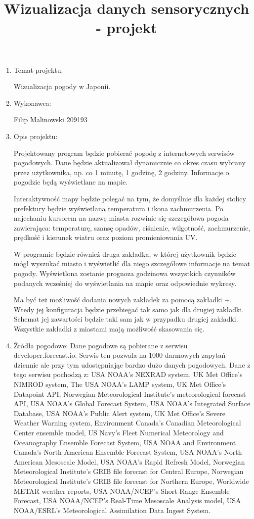 \documentclass[a4paper]{article}
\title{Wizualizacja danych sensorycznych - projekt}
\date{}
\begin{document}
\maketitle

\begin{enumerate}

\item Temat projektu:

Wizualizacja pogody w Japonii.

\item Wykonawca:

Filip Malinowski 209193

\item Opis projektu:

Projektowany program będzie pobierać pogodę z internetowych serwisów pogodowych. Dane będzie aktualizował dynamicznie co okres czasu wybrany przez użytkownika, np. co 1 minutę, 1 godzinę, 2 godziny. Informacje o pogodzie będą wyświetlane na mapie.

Interaktywność mapy będzie polegać na tym, że domyślnie dla każdej stolicy prefektury będzie wyświetlana temperatura i ikona zachmurzenia. Po najechaniu kursorem na nazwę miasta rozwinie się szczegółowa pogoda zawierająca: temperaturę, szansę opadów, ciśnienie, wilgotność, zachmurzenie, prędkość i kierunek wiatru oraz poziom promieniowania UV.

W programie będzie również druga zakładka, w której użytkownik będzie mógł wyszukać miasto i wyświetlić dla niego szczegółowe informacje na temat pogody. Wyświetlona zostanie prognoza godzinowa wszystkich czynników podanych wcześniej do wyświetlania na mapie oraz odpowiednie wykresy.

Ma być też możliwość dodania nowych zakładek za pomocą zakładki +. Wtedy jej konfiguracja będzie przebiegać tak samo jak dla drugiej zakładki. Schemat jej zawartości będzie taki sam jak w przypadku drugiej zakładki. Wszystkie zakładki z miastami mają możliwość skasowania się.

\item Źródła pogodowe:
Dane pogodowe są pobierane z serwisu developer.forecast.io. Serwis ten pozwala na 1000 darmowych zapytań dziennie ale przy tym udostępniając bardzo dużo danych pogodowych. Dane z tego serwisu pochodzą z: USA NOAA’s NEXRAD system, UK Met Office’s NIMROD system, The USA NOAA’s LAMP system, UK Met Office’s Datapoint API, Norwegian Meteorological Institute’s meteorological forecast API, USA NOAA’s Global Forecast System, USA NOAA’s Integrated Surface Database, USA NOAA’s Public Alert system, UK Met Office’s Severe Weather Warning system, Environment Canada’s Canadian Meteorological Center ensemble model, US Navy’s Fleet Numerical Meteorology and Oceanography Ensemble Forecast System, USA NOAA and Environment Canada’s North American Ensemble Forecast System, USA NOAA’s North American Mesoscale Model, USA NOAA’s Rapid Refresh Model, Norwegian Meteorological Institute’s GRIB file forecast for Central Europe, Norwegian Meteorological Institute’s GRIB file forecast for Northern Europe, Worldwide METAR weather reports, USA NOAA/NCEP’s Short-Range Ensemble Forecast, USA NOAA/NCEP’s Real-Time Mesoscale Analysis model, USA NOAA/ESRL’s Meteorological Assimilation Data Ingest System.


\end{enumerate}
\end{document}
